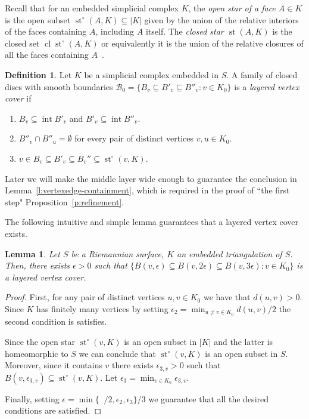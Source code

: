 \documentclass[reqno,english]{amsart}
\newtheorem{lemma}[theorem]{Lemma}
\numberwithin{claimcounter}{theorem}
\theoremstyle{remark}
\theoremstyle{definition}
\newtheorem{definition}[theorem]{Definition}
\numberwithin{theorem}{section}
\DeclareMathOperator{\st}{st}
\DeclareMathOperator{\interior}{int}
\DeclareMathOperator{\rinj}{r_{inj}}
\DeclareMathOperator{\cl}{cl}
\begin{document}
Recall that for an embedded simplicial complex $K$, the \emph{open star of a face $A\in K$} is the open subset $\st^\circ(A,K)\subseteq |K|$ given by the union of the relative interiors of the faces containing $A$, including $A$ itself. The \emph{closed star $\st(A,K)$} is the closed set $\cl \st^\circ(A,K)$ or equivalently it is the union of the relative closures of all the faces containing $A$~\cite{munkres84-elements}.

\begin{definition}
    Let $K$ be a simplicial complex embedded in $S$. A family of closed discs with smooth boundaries $\mathcal{B}_0 = \{B_v \subseteq B'_v \subseteq B''_v \colon v\in K_0 \}$ is a \emph{layered vertex cover} if 
    \begin{enumerate}
        \item $B_v\subseteq \interior B'_v$ and $B'_v\subseteq \interior B''_v$.
        \item $B''_v\cap B''_u = \emptyset$ for every pair of distinct vertices $v,u\in K_0$.
        \item $v \in B_v\subseteq B'_v\subseteq B_v'' \subseteq \st^\circ(v,K)$.
    \end{enumerate}
\end{definition}
Later we will make the middle layer wide enough to guarantee the conclusion in Lemma~\ref{l:vertexedge-containment}, which is required in the proof of ``the first step" Proposition~\ref{p:refinement}.

The following intuitive and simple lemma guarantees that a layered vertex cover exists. 
\begin{lemma}
\label{l:vertexdisc}
Let $S$ be a Riemannian surface, $K$ an embedded triangulation of $S$. Then, there exists $\epsilon>0$ such that $\{B(v,\epsilon)\subseteq B(v,2\epsilon) \subseteq B(v,3\epsilon) \colon v\in K_0 \}$ is a layered vertex cover.
\end{lemma}
\begin{proof}    
    First, for any pair of distinct vertices $u,v\in K_0$ we have that $d(u,v)>0$. Since $K$ has finitely many vertices by setting $\epsilon_2 = \min_{u\neq v\in K_0}d(u,v)/2$ the second condition is satisfies.

    Since the open star $\st^\circ(v,K)$ is an open subset in $|K|$ and the latter is homeomorphic to $S$ we can conclude that $\st^\circ(v,K)$ is an open subset in $S$. Moreover, since it contains $v$ there exists $\epsilon_{3,v}>0$ such that $B(v,\epsilon_{3,v})\subseteq \st^\circ(v,K)$.
    Let $\epsilon_3=\min_{v\in K_0} \epsilon_{3,v}$.

    Finally, setting $\epsilon=\min\{\rinj/2,\epsilon_2,\epsilon_3\}/3$ we guarantee that all the desired conditions are satisfied.
\end{proof}
\end{document}
